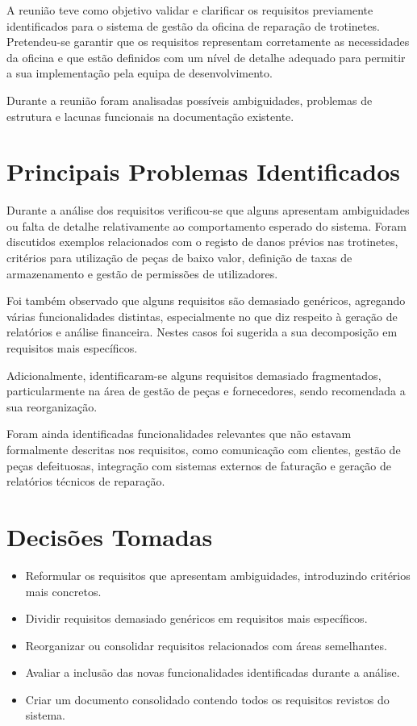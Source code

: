 \documentclass[12pt]{article}
\begin{document}
A reunião teve como objetivo validar e clarificar os requisitos previamente identificados para o sistema de gestão da oficina de reparação de trotinetes. Pretendeu-se garantir que os requisitos representam corretamente as necessidades da oficina e que estão definidos com um nível de detalhe adequado para permitir a sua implementação pela equipa de desenvolvimento.

Durante a reunião foram analisadas possíveis ambiguidades, problemas de estrutura e lacunas funcionais na documentação existente.

\vspace{0.5cm}

\section*{Principais Problemas Identificados}

Durante a análise dos requisitos verificou-se que alguns apresentam ambiguidades ou falta de detalhe relativamente ao comportamento esperado do sistema. Foram discutidos exemplos relacionados com o registo de danos prévios nas trotinetes, critérios para utilização de peças de baixo valor, definição de taxas de armazenamento e gestão de permissões de utilizadores.

Foi também observado que alguns requisitos são demasiado genéricos, agregando várias funcionalidades distintas, especialmente no que diz respeito à geração de relatórios e análise financeira. Nestes casos foi sugerida a sua decomposição em requisitos mais específicos.

Adicionalmente, identificaram-se alguns requisitos demasiado fragmentados, particularmente na área de gestão de peças e fornecedores, sendo recomendada a sua reorganização.

Foram ainda identificadas funcionalidades relevantes que não estavam formalmente descritas nos requisitos, como comunicação com clientes, gestão de peças defeituosas, integração com sistemas externos de faturação e geração de relatórios técnicos de reparação.

\vspace{0.5cm}

\section*{Decisões Tomadas}

\begin{itemize}
\item Reformular os requisitos que apresentam ambiguidades, introduzindo critérios mais concretos.
\item Dividir requisitos demasiado genéricos em requisitos mais específicos.
\item Reorganizar ou consolidar requisitos relacionados com áreas semelhantes.
\item Avaliar a inclusão das novas funcionalidades identificadas durante a análise.
\item Criar um documento consolidado contendo todos os requisitos revistos do sistema.
\end{itemize}
\end{document}
